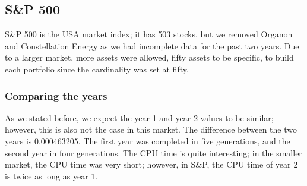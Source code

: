 \documentclass[12pt]{report}
\begin{document}
\subsection{S\&P 500}
S\&P 500 is the USA market index; it has 503 stocks, but we removed Organon and Constellation Energy as we had incomplete data for the past two years. Due to a larger market, more assets were allowed, fifty assets to be specific, to build each portfolio since the cardinality was set at fifty.
\subsubsection*{Comparing the years}
\begin{table}[h!]
\centering
{}
\caption{S\&P: Year 1 vs Year 2}
\label{table:s&pyears}
\end{table}
\noindent
As we stated before, we expect the year 1 and year 2 values to be similar; however, this is also not the case in this market. The difference between the two years is 0.000463205. The first year was completed in five generations, and the second year in four generations. The CPU time is quite interesting; in the smaller market, the CPU time was very short; however, in S\&P, the CPU time of year 2 is twice as long as year 1. 
\end{document}
